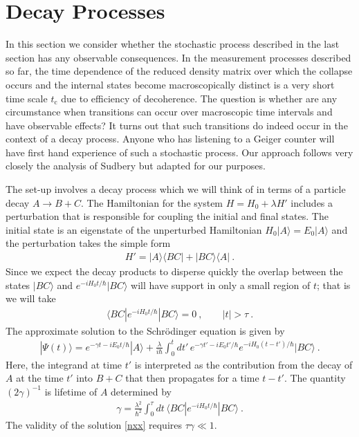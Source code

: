 \documentclass[12pt]{article}
\def\bra#1{\langle #1|}
\def\ket#1{| #1\rangle}
\newcommand{\EQ}[1]{\begin{equation}\begin{split} #1
\end{split}\end{equation}}
\begin{document}
\section{Decay Processes}\label{s5}

In this section we consider whether the stochastic process described in the last section has any 
observable consequences. In the measurement processes described so far, the 
time dependence of the reduced density matrix over which the collapse occurs 
and the internal states become macroscopically distinct
is a very short time scale $t_\text{c}$ due to efficiency of decoherence. The question is whether are any circumstance when transitions can occur over macroscopic time intervals and have observable effects? It turns out that such transitions do indeed occur in the context of a decay process. Anyone who has listening to a Geiger counter will have first hand experience of such a stochastic process. Our approach follows very closely the analysis of Sudbery \cite{Sud1} but adapted for our purposes.

The set-up involves a decay process which we will think of in terms of a particle decay $A\to B+C$. The Hamiltonian for the system $H=H_0+\lambda H'$
includes a perturbation that is responsible for coupling the initial and final states. The initial state is an eigenstate of the unperturbed Hamiltonian $H_0\ket{A}=E_0\ket{A}$ and the perturbation takes the simple form
\EQ{
H'=\ket{A}\bra{BC}+\ket{BC}\bra{A}\ .
}
Since we expect the decay products to disperse quickly the overlap between the states $\ket{BC}$ and $e^{-iH_0t/\hbar}\ket{BC}$ will have support in only a small region of $t$; that is we will take
\EQ{
\bra{BC}e^{-iH_0t/\hbar}\ket{BC}=0\ ,\qquad |t|>\tau\ .
\label{op1}
}
The approximate solution to the Schr\"odinger equation is given by
\EQ{
\ket{\Psi(t)}=e^{-\gamma t-iE_0t/\hbar}\ket{A}+\frac{\lambda}{i\hbar}\int_0^t dt'\,e^{-\gamma t'-iE_0t'/\hbar}e^{-iH_0(t-t')/\hbar}\ket{BC}\ .
\label{nxx}
}
Here, the integrand at time $t'$ is interpreted as the contribution from the decay of $A$ at the time $t'$ into $B+C$ that then propagates for a time $t-t'$. 
The quantity $(2\gamma)^{-1}$ is lifetime of $A$ determined by
\EQ{
\gamma=\frac{\lambda^2}{\hbar^2}\int_0^\tau dt\,\bra{BC}e^{-iH_0t/\hbar}\ket{BC}\ .
\label{gyq}
}
The validity of the solution \eqref{nxx} requires $\tau\gamma\ll1$.
\end{document}
